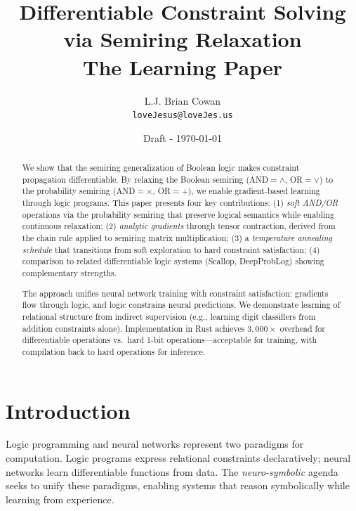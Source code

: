 \documentclass[11pt,a4paper]{article}
\title{Differentiable Constraint Solving via Semiring Relaxation\\
\large The Learning Paper}
\author{
  L.J. Brian Cowan \\
  \texttt{loveJesus@loveJes.us}
}
\date{Draft - \today}
\begin{document}
\maketitle

\begin{abstract}
We show that the semiring generalization of Boolean logic makes constraint propagation differentiable.
By relaxing the Boolean semiring (AND$=\land$, OR$=\lor$) to the probability semiring (AND$=\times$, OR$=+$), we enable gradient-based learning through logic programs.
This paper presents four key contributions:
(1) \emph{soft AND/OR} operations via the probability semiring that preserve logical semantics while enabling continuous relaxation;
(2) \emph{analytic gradients} through tensor contraction, derived from the chain rule applied to semiring matrix multiplication;
(3) a \emph{temperature annealing schedule} that transitions from soft exploration to hard constraint satisfaction;
(4) comparison to related differentiable logic systems (Scallop, DeepProbLog) showing complementary strengths.

The approach unifies neural network training with constraint satisfaction: gradients flow through logic, and logic constrains neural predictions.
We demonstrate learning of relational structure from indirect supervision (e.g., learning digit classifiers from addition constraints alone).
Implementation in Rust achieves $3{,}000\times$ overhead for differentiable operations vs.\ hard 1-bit operations---acceptable for training, with compilation back to hard operations for inference.
\end{abstract}

\section{Introduction}
\label{sec:intro_chirho}

\scopeclarification

Logic programming and neural networks represent two paradigms for computation.
Logic programs express relational constraints declaratively; neural networks learn differentiable functions from data.
The \emph{neuro-symbolic} agenda seeks to unify these paradigms, enabling systems that reason symbolically while learning from experience.
\end{document}
